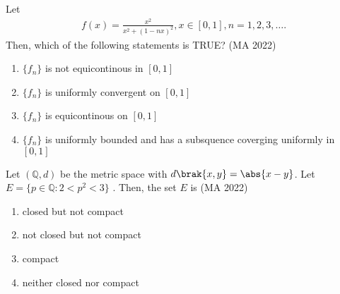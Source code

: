 \iffalse
\title{MA-2020-40-52}
\author{EE24BTECH11041-Mohit}
\section{XE}
\chapter{2020}
\fi


\item Let \\
\begin{align}
f(x)=\frac{x^2}{x^2+(1-nx)^2}, x \in [0,1], n = 1,2,3,\dots  .
\end{align}
Then, which of the following statements is TRUE?
\hfill{(MA 2022)}
\begin{enumerate}
\item $\{f_n\}$ is not equicontinous in $[0,1]$
\item $\{f_n\}$ is uniformly convergent on $[0,1]$
\item $\{f_n\}$ is equicontinous on $[0,1]$
\item $\{f_n\}$ is uniformly bounded and has a subsquence coverging uniformly in $[0,1]$
\end{enumerate}
\item Let $(\mathbb{Q},d)$ be the metric space with $d\brak{x,y} = \abs{x-y}$. Let $E = \{p \in \mathbb{Q} : 2 < p^2 < 3 \}$ . Then, the set $E$ is 
\hfill{(MA 2022)}
\begin{enumerate}
\item closed but not compact
\item not closed but not compact
\item compact
\item neither closed nor compact
\end{enumerate}

